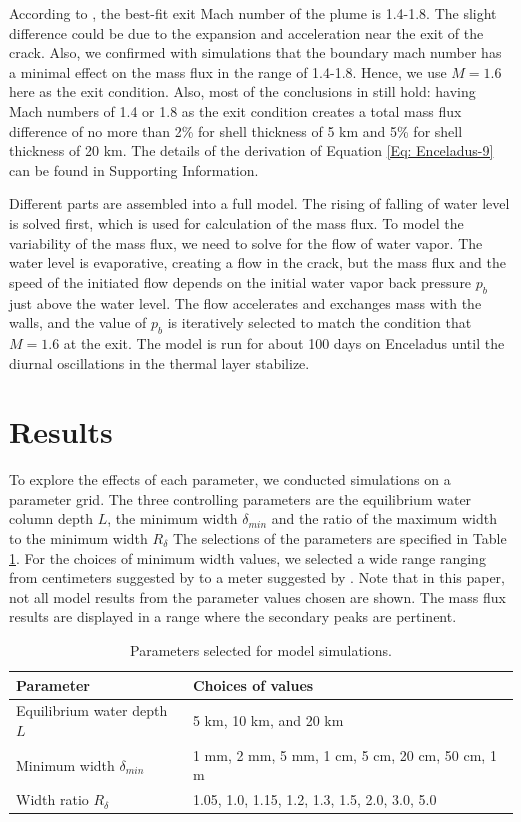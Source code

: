 \documentclass[draft]{agujournal2019}
\begin{document}
\begin{refsection}
According to , the best-fit exit Mach number of the plume is 1.4-1.8. The slight difference could be due to the expansion and acceleration near the exit of the crack. Also, we confirmed with simulations that the boundary mach number has a minimal effect on the mass flux in the range of 1.4-1.8. Hence, we use $M=1.6$ here as the exit condition. Also, most of the conclusions in  still hold: having Mach numbers of 1.4 or 1.8 as the exit condition creates a total mass flux difference of no more than 2\% for shell thickness of 5 km and 5\% for shell thickness of 20 km. The details of the derivation of Equation \ref{Eq: Enceladus-9} can be found in Supporting Information. 

Different parts are assembled into a full model. The rising of falling of water level is solved first, which is used for calculation of the mass flux. To model the variability of the mass flux, we need to solve for the flow of water vapor. The water level is evaporative, creating a flow in the crack, but the mass flux and the speed of the initiated flow depends on the initial water vapor back pressure $p_b$ just above the water level. The flow accelerates and exchanges mass with the walls, and the value of $p_b$ is iteratively selected to match the condition that $M=1.6$ at the exit. The model is run for about 100 days on Enceladus until the diurnal oscillations in the thermal layer stabilize. 

\section{Results}
To explore the effects of each parameter, we conducted simulations on a parameter grid. The three controlling parameters are the equilibrium water column depth $L$, the minimum width $\delta_{min}$ and the ratio of the maximum width to the minimum width $R_{\delta}$ The selections of the parameters are specified in Table \ref{tbl:enc:model_parameters}. For the choices of minimum width values, we selected a wide range ranging from centimeters suggested by  to a meter suggested by . Note that in this paper, not all model results from the parameter values chosen are shown. The mass flux results are displayed in a range where the secondary peaks are pertinent. 

\begin{table}[hbt!]
    \centering
    \begin{tabular}{l l}
        \hline
        \textbf{Parameter} & \textbf{Choices of values} \\
        \hline
        Equilibrium water depth $L$ & 5 km, 10 km, and 20 km \\
        Minimum width $\delta_{min}$ & 1 mm, 2 mm, 5 mm, 1 cm, 5 cm, 20 cm, 50 cm, 1 m \\
        Width ratio $R_\delta$ & 1.05, 1.0, 1.15, 1.2, 1.3, 1.5, 2.0, 3.0, 5.0 \\
        \hline
    \end{tabular}
    \caption{Parameters selected for model simulations.}
    \label{tbl:enc:model_parameters}
\end{table}


\end{refsection}
\end{document}
